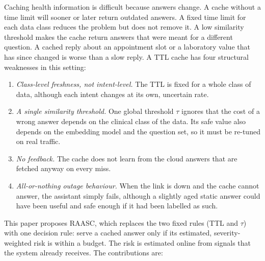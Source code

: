 \documentclass[journal]{IEEEtran}
\begin{document}
Caching health information is difficult because answers change. A cache without a time limit will sooner or later return outdated answers. A fixed time limit for each data class reduces the problem but does not remove it. A low similarity threshold makes the cache return answers that were meant for a different question. A cached reply about an appointment slot or a laboratory value that has since changed is worse than a slow reply. A TTL cache has four structural weaknesses in this setting:
\begin{enumerate}
\item \emph{Class-level freshness, not intent-level.} The TTL is fixed for a whole class of data, although each intent changes at its own, uncertain rate.
\item \emph{A single similarity threshold.} One global threshold $\tau$ ignores that the cost of a wrong answer depends on the clinical class of the data. Its safe value also depends on the embedding model and the question set, so it must be re-tuned on real traffic.
\item \emph{No feedback.} The cache does not learn from the cloud answers that are fetched anyway on every miss.
\item \emph{All-or-nothing outage behaviour.} When the link is down and the cache cannot answer, the assistant simply fails, although a slightly aged static answer could have been useful and safe enough if it had been labelled as such.
\end{enumerate}
This paper proposes RAASC, which replaces the two fixed rules (TTL and $\tau$) with one decision rule: serve a cached answer only if its estimated, severity-weighted risk is within a budget. The risk is estimated online from signals that the system already receives. The contributions are:
\end{document}
